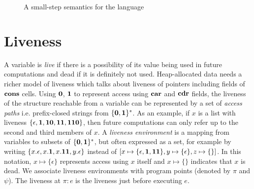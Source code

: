 \documentclass[9pt]{sigplanconf}
\begin{document}
\begin{figure*}[t!]
\begin{center}
\caption{A small-step semantics for the language}\label{fig:lang-semantics}
\end{center}
\end{figure*}


\renewcommand{\pp}[2]{\ensuremath{#1\!\!:\!#2}} %



\section{Liveness}\label{sec:liveness}

A variable is {\em live} if  there is a possibility of its value being
used in  future computations  and dead if  it is definitely  not used.
Heap-allocated data needs a richer model of liveness which talks about
liveness  of  pointers  including  fields  of  $\mbox{$\mathbf{cons}$}$  cells.   Using
$\mathbf{0}$, $\mathbf{1}$  to represent access using $\mbox{$\mathbf{car}$}$  and $\mbox{$\mathbf{cdr}$}$ fields,
the  liveness  of the  structure  reachable  from  a variable  can  be
represented by a set of {\em access paths} i.e.  prefix-closed strings
from $\{\mathbf{0},\mathbf{1}\}^\ast$.   As an  example, if $x$  is a  list with
liveness      $\{\epsilon,     \mathbf{1},      \mathbf{1}\mathbf{0},     \mathbf{1}\mathbf{1},
\mathbf{1}\mathbf{1}\mathbf{0}\}$, then future computations  can only refer up to the
second and  third members of $x$.   A {\em liveness  environment} is a
mapping from variables to subsets of $\{\mathbf{0},\mathbf{1}\}^\ast$, but often
expressed  as a set,  for example  by writing  $\{x.\epsilon, x.\mathbf{1},
x.\mathbf{1}\mathbf{1},        y.\epsilon\}$        instead        of        $[x
  \mapsto\{\epsilon,\mathbf{1},\mathbf{1}\mathbf{1}\},           y\mapsto\{\epsilon\},
  z\mapsto\{\}]$.    In  this   notation,  $x   \mapsto  \{\epsilon\}$
represents access using $x$ itself and $x \mapsto \{\}$ indicates that
$x$ is dead.  We associate  liveness environments with program points
(denoted by $\pi$ and $\psi$).  The liveness at $\pi:e$  is the liveness just before executing
$e$.
\end{document}
